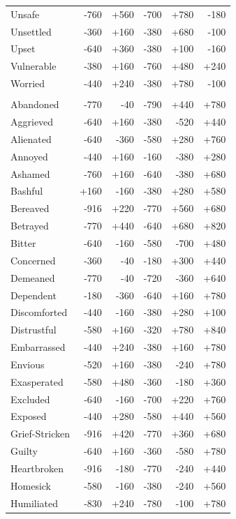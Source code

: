 \begin{longtable}{@{}p{}rrrrr@{}}
Unsafe & -760 & +560 & -700 & +780 & -180 \\
Unsettled & -360 & +160 & -380 & +680 & -100 \\
Upset & -640 & +360 & -380 & +100 & -160 \\
Vulnerable & -380 & +160 & -760 & +480 & +240 \\
Worried & -440 & +240 & -380 & +780 & -100 \\
\addlinespace[2pt]\multicolumn{6}{@{}l}{\textbf{Socially Vulnerable} ($n=47$)} \\
Abandoned & -770 & -40 & -790 & +440 & +780 \\
Aggrieved & -640 & +160 & -380 & -520 & +440 \\
Alienated & -640 & -360 & -580 & +280 & +760 \\
Annoyed & -440 & +160 & -160 & -380 & +280 \\
Ashamed & -760 & +160 & -640 & -380 & +680 \\
Bashful & +160 & -160 & -380 & +280 & +580 \\
Bereaved & -916 & +220 & -770 & +560 & +680 \\
Betrayed & -770 & +440 & -640 & +680 & +820 \\
Bitter & -640 & -160 & -580 & -700 & +480 \\
Concerned & -360 & -40 & -180 & +300 & +440 \\
Demeaned & -770 & -40 & -720 & -360 & +640 \\
Dependent & -180 & -360 & -640 & +160 & +780 \\
Discomforted & -440 & -160 & -380 & +280 & +100 \\
Distrustful & -580 & +160 & -320 & +780 & +840 \\
Embarrassed & -440 & +240 & -380 & +160 & +780 \\
Envious & -520 & +160 & -380 & -240 & +780 \\
Exasperated & -580 & +480 & -360 & -180 & +360 \\
Excluded & -640 & -160 & -700 & +220 & +760 \\
Exposed & -440 & +280 & -580 & +440 & +560 \\
Grief-Stricken & -916 & +420 & -770 & +360 & +680 \\
Guilty & -640 & +160 & -360 & -580 & +780 \\
Heartbroken & -916 & -180 & -770 & -240 & +440 \\
Homesick & -580 & -160 & -380 & -240 & +560 \\
Humiliated & -830 & +240 & -780 & -100 & +780 \\

\end{longtable}
